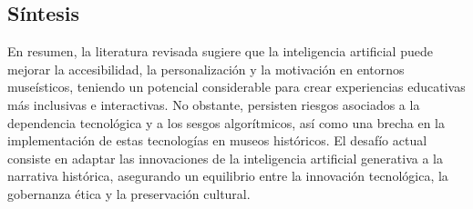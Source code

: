 \documentclass[pdflatex,sn-mathphys-num]{sn-jnl}%
\theoremstyle{thmstyleone}%
\theoremstyle{thmstyletwo}%
\theoremstyle{thmstylethree}%
\begin{document}
\subsection{Síntesis}
En resumen, la literatura revisada sugiere que la inteligencia artificial puede mejorar la accesibilidad, la personalización y la motivación en entornos museísticos, teniendo un potencial considerable para crear experiencias educativas más inclusivas e interactivas. No obstante, persisten riesgos asociados a la dependencia tecnológica y a los sesgos algorítmicos, así como una brecha en la implementación de estas tecnologías en museos históricos. El desafío actual consiste en adaptar las innovaciones de la inteligencia artificial generativa a la narrativa histórica, asegurando un equilibrio entre la innovación tecnológica, la gobernanza ética y la preservación cultural.
\end{document}
